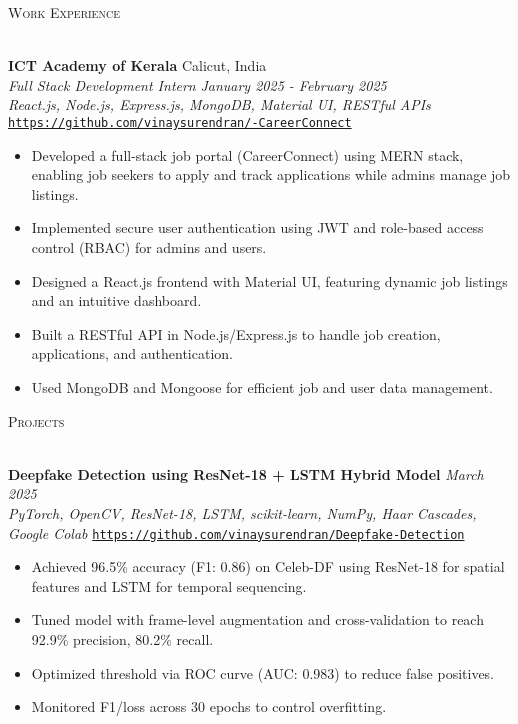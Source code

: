 \documentclass[letterpaper]{article}
\newcommand{\lineunder} {
    \vspace*{-8pt} \\
    \hspace*{-18pt} \hrulefill \\
}
\newcommand{\header} [1] {
    {\hspace*{-18pt}\vspace*{6pt} \textsc{#1}}
    \vspace*{-6pt} \lineunder
}
\begin{document}
\header{Work Experience}
\vspace{1mm}

    \textbf{ICT Academy of Kerala} \hfill Calicut, India\\
    \textit{Full Stack Development Intern} \hfill \textsl{January 2025 - February 2025}\\
    \textsl{React.js, Node.js, Express.js, MongoDB, Material UI, RESTful APIs} \hfill \texttt{\href{https://github.com/vinaysurendran/-CareerConnect}{https://github.com/vinaysurendran/-CareerConnect}} \\
    \vspace{-7pt}
    \begin{itemize} \itemsep -1mm
        \item Developed a full-stack job portal (CareerConnect) using MERN stack, enabling job seekers to apply and track applications while admins manage job listings.
        \item Implemented secure user authentication using JWT and role-based access control (RBAC) for admins and users.
        \item Designed a React.js frontend with Material UI, featuring dynamic job listings and an intuitive dashboard.
        \item Built a RESTful API in Node.js/Express.js to handle job creation, applications, and authentication.
        \item Used MongoDB and Mongoose for efficient job and user data management.
    \end{itemize}
    \vspace{-2mm}

\header{Projects}
\vspace{1mm}

    \textbf{Deepfake Detection using ResNet-18 + LSTM Hybrid Model} \hfill \textsl{March 2025} \\
    \textsl{PyTorch, OpenCV, ResNet-18, LSTM, scikit-learn, NumPy, Haar Cascades, Google Colab} \hfill \texttt{\href{https://github.com/vinaysurendran/Deepfake-Detection}{https://github.com/vinaysurendran/Deepfake-Detection}} \\
    \vspace{-2mm}
    \begin{itemize} \itemsep -1mm
        \item Achieved 96.5\% accuracy (F1: 0.86) on Celeb-DF using ResNet-18 for spatial features and LSTM for temporal sequencing.
        \item Tuned model with frame-level augmentation and cross-validation to reach 92.9\% precision, 80.2\% recall.
        \item Optimized threshold via ROC curve (AUC: 0.983) to reduce false positives.
        \item Monitored F1/loss across 30 epochs to control overfitting.
    \end{itemize}
    \vspace{-1mm}
\end{document}
